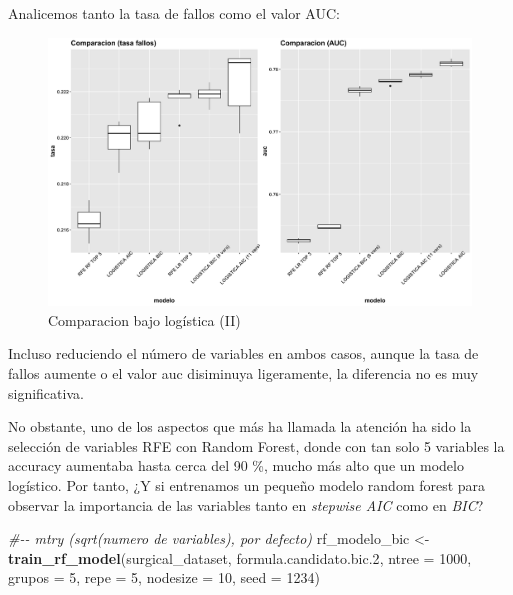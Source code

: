 \documentclass[
]{article}
\newenvironment{Shaded}{\begin{snugshade}}{\end{snugshade}}
\newcommand{\CommentTok}[1]{\textcolor[rgb]{0.56,0.35,0.01}{\textit{#1}}}
\newcommand{\DataTypeTok}[1]{\textcolor[rgb]{0.13,0.29,0.53}{#1}}
\newcommand{\DecValTok}[1]{\textcolor[rgb]{0.00,0.00,0.81}{#1}}
\newcommand{\FloatTok}[1]{\textcolor[rgb]{0.00,0.00,0.81}{#1}}
\newcommand{\KeywordTok}[1]{\textcolor[rgb]{0.13,0.29,0.53}{\textbf{#1}}}
\newcommand{\NormalTok}[1]{#1}
\newcommand{\StringTok}[1]{\textcolor[rgb]{0.31,0.60,0.02}{#1}}
\begin{document}
Analicemos tanto la tasa de fallos como el valor AUC:

\begin{figure}[h!]

{\centering \includegraphics[width=0.97\linewidth,height=0.97\textheight,]{./charts/01_feature_selection_segunda_comparacion} 

}

\caption{Comparacion bajo logística (II)}\label{fig:unnamed-chunk-39}
\end{figure}

Incluso reduciendo el número de variables en ambos casos, aunque la tasa
de fallos aumente o el valor auc disiminuya ligeramente, la diferencia
no es muy significativa.

No obstante, uno de los aspectos que más ha llamada la atención ha sido
la selección de variables RFE con Random Forest, donde con tan solo 5
variables la accuracy aumentaba hasta cerca del 90 \%, mucho más alto
que un modelo logístico. Por tanto, ¿Y si entrenamos un pequeño modelo
random forest para observar la importancia de las variables tanto en
\emph{stepwise AIC} como en \emph{BIC}?

\begin{Shaded}
\begin{Highlighting}[]
\CommentTok{\#{-}{-} mtry (sqrt(numero de variables), por defecto)}
\NormalTok{rf\_modelo\_bic <{-}}\StringTok{ }\KeywordTok{train\_rf\_model}\NormalTok{(surgical\_dataset, formula.candidato.bic}\FloatTok{.2}\NormalTok{, }\DataTypeTok{ntree =} \DecValTok{1000}\NormalTok{, }
                                \DataTypeTok{grupos =} \DecValTok{5}\NormalTok{, }\DataTypeTok{repe =} \DecValTok{5}\NormalTok{, }\DataTypeTok{nodesize =} \DecValTok{10}\NormalTok{, }\DataTypeTok{seed =} \DecValTok{1234}\NormalTok{)}
\end{Highlighting}
\end{Shaded}
\end{document}
